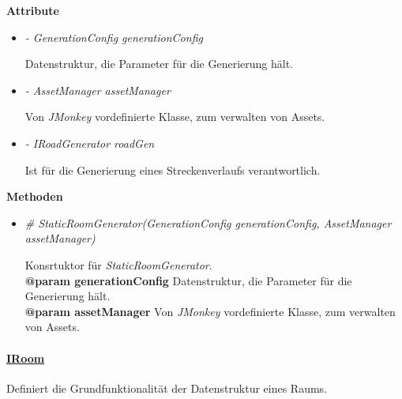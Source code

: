             \textbf{Attribute}
            \begin{itemize}
                \item  \textit{- GenerationConfig generationConfig} 
                    \begin{leftbar}[0.9\linewidth]
                        Datenstruktur, die Parameter für die Generierung hält.
                    \end{leftbar}
                
                \item  \textit{- AssetManager assetManager} 
                    \begin{leftbar}[0.9\linewidth]
                        Von \textit{JMonkey} vordefinierte Klasse, zum verwalten von Assets.
                    \end{leftbar}
                
                \item  \textit{- IRoadGenerator roadGen} 
                    \begin{leftbar}[0.9\linewidth]
                        Ist für die Generierung eines Streckenverlaufs verantwortlich.
                    \end{leftbar}
            \end{itemize}

            \textbf{Methoden}					
            \begin{itemize}
                \item  \textit{\# StaticRoomGenerator(GenerationConfig generationConfig, AssetManager assetManager)}
                    \begin{leftbar}[0.9\linewidth]
                        Konsrtuktor für \textit{StaticRoomGenerator}.\\
                        \textbf{@param generationConfig} Datenstruktur, die Parameter für die Generierung hält.\\
                        \textbf{@param assetManager}  Von \textit{JMonkey} vordefinierte Klasse, zum verwalten von Assets.
                    \end{leftbar}  
            \end{itemize}
        
        
        
        \paragraph{\underline{IRoom}} \mbox{}\par
            Definiert die Grundfunktionalität der Datenstruktur eines Raums.\par

